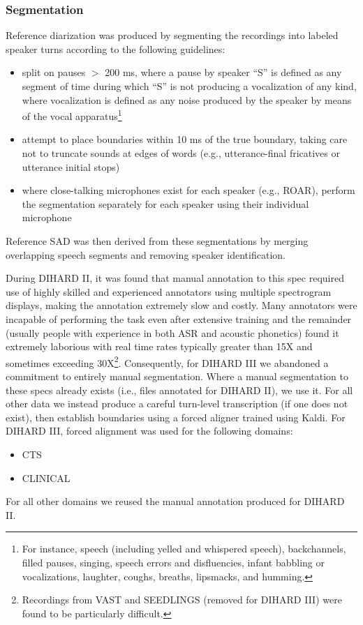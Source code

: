 \documentclass{article}
\begin{document}
\subsubsection{Segmentation}
\label{sec:single_track_segmentation}
Reference diarization was produced by segmenting the recordings into labeled speaker turns according to the following guidelines:
%
\begin{itemize}
    \item split on pauses $>$ 200 ms, where a pause by speaker ``S'' is defined as any segment of time during which ``S'' is not producing a vocalization of any kind, where vocalization is defined as any noise produced by the speaker by means of the vocal apparatus\footnote{For instance, speech (including yelled and whispered speech), backchannels, filled pauses, singing, speech errors and disfluencies, infant babbling or vocalizations, laughter, coughs, breaths, lipsmacks, and humming.}
    \item attempt to place boundaries within 10 ms of the true boundary, taking care not to truncate sounds at edges of words (e.g., utterance-final fricatives or utterance initial stops)
    \item where close-talking microphones exist for each speaker (e.g., ROAR), perform the segmentation separately for each speaker using their individual microphone
\end{itemize}
%
Reference SAD was then derived from these segmentations by merging overlapping speech segments and removing speaker identification.

During DIHARD II, it was found that manual annotation to this spec required use of highly skilled and experienced annotators using multiple spectrogram displays, making the annotation extremely slow and costly. Many annotators were incapable of performing the task even after extensive training and the remainder (usually people with experience in both ASR and acoustic phonetics) found it extremely laborious with real time rates typically greater than 15X and sometimes exceeding 30X\footnote{Recordings from VAST and SEEDLINGS (removed for DIHARD III) were found to be particularly difficult.}. Consequently, for DIHARD III we abandoned a commitment to entirely manual segmentation. Where a manual segmentation to these specs already exists (i.e., files annotated for DIHARD II), we use it. For all other data we instead produce a careful turn-level transcription (if one does not exist), then establish boundaries using a forced aligner trained using Kaldi. For DIHARD III, forced alignment was used for the following domains:
%
\begin{itemize}
    \item CTS
    \item CLINICAL
\end{itemize}
%
For all other domains we reused the manual annotation produced for DIHARD II.
\end{document}
